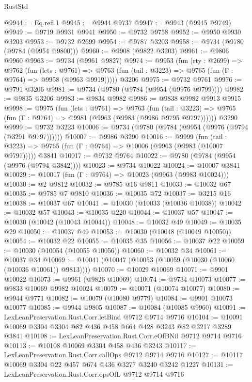 \begin{lexlean}{RustStd}
\begin{coremodule}
@9944 := Eq.refl.{1}
@9945 := @9944 @9737
@9947 := @9943 (@9945 @9749)
@9949 := @9719 @9931 @9941
@9950 := @9732 @9758
@9952 := @9950 @9930 @3203
@9953 := @9732 @2699
@9954 := @9787 @3203
@9958 := @9734 (@9780 (@9784 (@9954 @9800)))
@9960 := @9908 (@9822 @3203)
@9961 := @9806 @9960
@9963 := @9734 (@9961 @9827)
@9974 := @9953
    (fun (rty : @2699) =>
    @9762
      (fun (lets : @9761) =>
      @9763 (fun (tail : @3223) => @9765 (fun (Γ : @9764) => @9958 (@9963 @9919)))))
    @3206
@9975 := @9732 @9761
@9976 := @9791 @3206
@9981 := @9734 (@9780 (@9784 (@9954 (@9976 @9799))))
@9982 := @9835 @3206
@9983 := @9834 @9982
@9986 := @9838 @9982 @9913 @9915
@9998 := @9975
    (fun (lets : @9761) =>
    @9763
      (fun (tail : @3223) => @9765 (fun (Γ : @9764) => @9981 (@9963 (@9983 (@9986 @9795 @9797))))))
    @3290
@9999 := @9732 @3223
@10006 := @9734 (@9780 (@9784 (@9954 (@9976 (@9794 (@3291 @9797))))))
@10007 := @9986 @3290
@10016 := @9999
    (fun (tail : @3223) => @9765 (fun (Γ : @9764) => @10006 (@9963 (@9983 (@10007 @9797)))))
    @3841
@10017 := @9732 @9764
@10022 := @9780 (@9784 (@9954 (@9976 (@9794 @3842))))
@10023 := @9734 @10022
@10024 := @10007 @3841
@10029 := @10017 (fun (Γ : @9764) => @10023 (@9963 (@9983 @10024)))
@10030 := @2 @9812
@10032 := @9785 @16 @9811
@10033 := @10032 @67
@10035 := @9785 @7 @9810
@10036 := @10035 @72
@10037 := @3215 @16
@10038 := @10037 @67
@10041 := @10030 (@10033 (@10036 @10038))
@10042 := @10032 @57
@10043 := @10035 @220
@10044 := @10037 @57
@10047 := @10030 (@10042 (@10043 @10044))
@10048 := @10032 @49
@10049 := @10035 @29
@10050 := @10037 @49
@10053 := @10030 (@10048 (@10049 @10050))
@10054 := @10032 @22
@10055 := @10035 @35
@10056 := @10037 @22
@10059 := @10030 (@10054 (@10055 @10056))
@10060 := @10032 @34
@10061 := @10037 @34
@10069 := @10041 (@10047 (@10053 (@10059 (@10030 (@10060 (@10036 @10061)) @9813))))
@10070 := @10029 @10069
@10071 := @9901 @10022
@10073 := @9961 (@9826 @10069)
@10074 := @9734 @10073
@10077 := @9833 @10069 @9982 @10024
@10079 := @10071 (@10074 @10077)
@10080 := @9944 @9771
@10082 := @10079 (@10080 @9779)
@10084 := @9901 @10073 @10077
@10085 := @9944 @9805
@10087 := @10084 (@10085 @9960)
@10091 := LexLeanPreservation.Rust.Corr.letBind @9712 @9714 @9716
@10104 := @10091 @10069 @3304 @3304 @82 @436 @458 @664 @428 @3243 @82 @3217 @3289 @3841
@10108 := LexLeanPreservation.Rust.Corr.eOfBNil @9712 @9714 @9716
@10113 := @10108 @10069 @3304 @458 @436 @3243
@10117 := LexLeanPreservation.Rust.Corr.callOps @9712 @9714 @9716
@10127 := @10117 @10069 @3304 @22 @457 @674 @436 @3277 @3240 @3242 @1227
@10131 := LexLeanPreservation.Rust.Corr.opsOfL @9712 @9714 @9716

\end{coremodule}
\end{lexlean}
